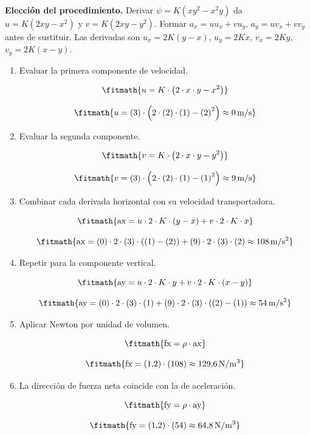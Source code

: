 \noindent\textbf{Elección del procedimiento.} Derivar $\psi=K(xy^2-x^2y)$ da $u=K(2xy-x^2)$ y $v=K(2xy-y^2)$. Formar $a_x=uu_x+vu_y$, $a_y=uv_x+vv_y$ antes de sustituir. Las derivadas son $u_x=2K(y-x)$, $u_y=2Kx$, $v_x=2Ky$, $v_y=2K(x-y)$.

\begin{enumerate}

\item Evaluar la primera componente de velocidad.

\[\fitmath{u=K\cdot \left(2\cdot x\cdot y-{x}^{2}\right)}\]

\[\fitmath{u=(3)\cdot \left(2\cdot (2)\cdot (1)-{(2)}^{2}\right)\approx 0\,\mathrm{m/s}}\]

\item Evaluar la segunda componente.

\[\fitmath{v=K\cdot \left(2\cdot x\cdot y-{y}^{2}\right)}\]

\[\fitmath{v=(3)\cdot \left(2\cdot (2)\cdot (1)-{(1)}^{2}\right)\approx 9\,\mathrm{m/s}}\]

\item Combinar cada derivada horizontal con su velocidad transportadora.

\[\fitmath{\mathrm{ax}=u\cdot 2\cdot K\cdot \left(y-x\right)+v\cdot 2\cdot K\cdot x}\]

\[\fitmath{\mathrm{ax}=(0)\cdot 2\cdot (3)\cdot \left((1)-(2)\right)+(9)\cdot 2\cdot (3)\cdot (2)\approx 108\,\mathrm{m/s^{2}}}\]

\item Repetir para la componente vertical.

\[\fitmath{\mathrm{ay}=u\cdot 2\cdot K\cdot y+v\cdot 2\cdot K\cdot \left(x-y\right)}\]

\[\fitmath{\mathrm{ay}=(0)\cdot 2\cdot (3)\cdot (1)+(9)\cdot 2\cdot (3)\cdot \left((2)-(1)\right)\approx 54\,\mathrm{m/s^{2}}}\]

\item Aplicar Newton por unidad de volumen.

\[\fitmath{\mathrm{fx}=\rho\cdot \mathrm{ax}}\]

\[\fitmath{\mathrm{fx}=(1{,}2)\cdot (108)\approx 129{,}6\,\mathrm{N/m^{3}}}\]

\item La dirección de fuerza neta coincide con la de aceleración.

\[\fitmath{\mathrm{fy}=\rho\cdot \mathrm{ay}}\]

\[\fitmath{\mathrm{fy}=(1{,}2)\cdot (54)\approx 64{,}8\,\mathrm{N/m^{3}}}\]


\end{enumerate}
